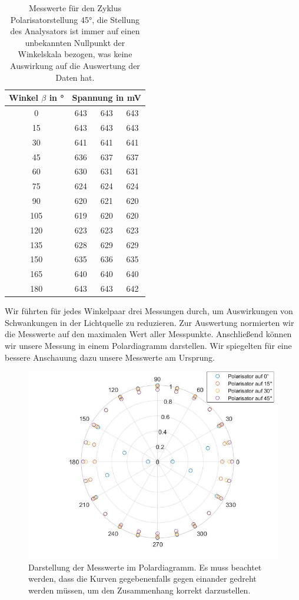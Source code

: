 \documentclass[a4paper, 12pt,]{scrartcl}
\begin{document}
\begin{table}[H]\centering\begin{tabular}{c |ccc}Winkel $\beta$ in °&\multicolumn{3}{c}{Spannung in mV}\\\hline
0	&643&	643	&643\\
15	&643&	643	&643\\
30	&641&	641	&641\\
45	&636&	637	&637\\
60	&630&	631	&631\\
75	&624&	624	&624\\
90	&620&	621	&620\\
105	&619&	620	&620\\
120	&623&	623	&623\\
135	&628	&629	&629\\
150	&635	&636	&635\\
165	&640	&640	&640\\
180	&643	&643&	642
\end{tabular}\caption{Messwerte für den Zyklus Polarisatorstellung 45°, die Stellung des Analysators ist immer auf einen unbekannten Nullpunkt der Winkelskala bezogen, was keine Auswirkung auf die Auswertung der Daten hat.}\end{table}

Wir führten für jedes Winkelpaar drei Messungen durch, um Auswirkungen von Schwankungen in der Lichtquelle zu reduzieren. Zur Auswertung normierten wir die Messwerte auf den maximalen Wert aller Messpunkte. Anschließend können wir unsere Messung in einem Polardiagramm darstellen. Wir spiegelten für eine bessere Anschauung dazu unsere Messwerte am Ursprung.
\begin{figure}[H]\centering\includegraphics[scale=0.5]{tot2}\caption{Darstellung der Messwerte im Polardiagramm. Es muss beachtet werden, dass die Kurven gegebenenfalls gegen einander gedreht werden müssen, um den Zusammenhang korrekt darzustellen.}\end{figure}
\end{document}
